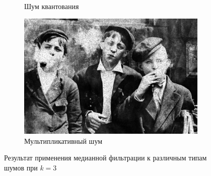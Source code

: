 \begin{figure}[ht]
\begin{subfigure}[b]{0.5\linewidth}
      \caption{Шум квантования} 
      \label{median_3:e}
    \end{subfigure}%
    \begin{subfigure}[b]{0.5\linewidth}
        \centering
        \includegraphics[width=0.95\linewidth]{../Median_FIlter/Median_Speckle_noise_(k=3).jpg} 
        \caption{Мультипликативный шум} 
        \label{median_3:f} 
    \end{subfigure} 
    \caption{Результат применения медианной фильтрации к различным типам шумов при $k = 3$}
    \label{img:median_3} 
\end{figure}


